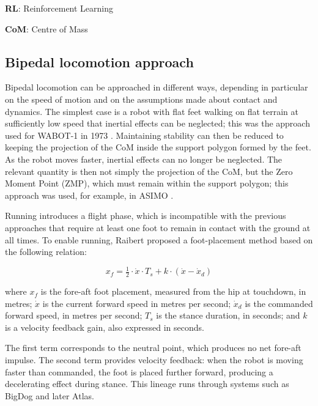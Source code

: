 \textbf{RL}: Reinforcement Learning

\textbf{CoM}: Centre of Mass

\subsection{Bipedal locomotion approach}

\label{sec:bg-hard}

Bipedal locomotion can be approached in different ways, depending in particular on the speed of motion and on the assumptions made about contact and dynamics. The simplest case is a robot with flat feet walking on flat terrain at sufficiently low speed that inertial effects can be neglected; this was the approach used for WABOT-1 in 1973 \cite{waseda2026wabot1}. Maintaining stability can then be reduced to keeping the projection of the CoM inside the support polygon formed by the feet. As the robot moves faster, inertial effects can no longer be neglected. The relevant quantity is then not simply the projection of the CoM, but the Zero Moment Point (ZMP), which must remain within the support polygon; this approach was used, for example, in ASIMO \cite{whatimakethis2020asimo}.

Running introduces a flight phase, which is incompatible with the previous approaches that require at least one foot to remain in contact with the ground at all times. To enable running, Raibert \cite{raibert1986} proposed a foot-placement method based on the following relation:

\begin{equation}
  x_f = \tfrac{1}{2} \cdot \dot{x} \cdot T_s + k \cdot (\dot{x} - \dot{x}_d)
  \label{eq:neutral-point}
\end{equation}

where $x_f$ is the fore-aft foot placement, measured from the hip at touchdown, in metres; $\dot{x}$ is the current forward speed in metres per second; $\dot{x}_d$ is the commanded forward speed, in metres per second; $T_s$ is the stance duration, in seconds; and $k$ is a velocity feedback gain, also expressed in seconds.

The first term corresponds to the neutral point, which produces no net fore-aft impulse. The second term provides velocity feedback: when the robot is moving faster than commanded, the foot is placed further forward, producing a decelerating effect during stance. This lineage runs through systems such as BigDog \cite{raibert2008bigdog} and later Atlas.

